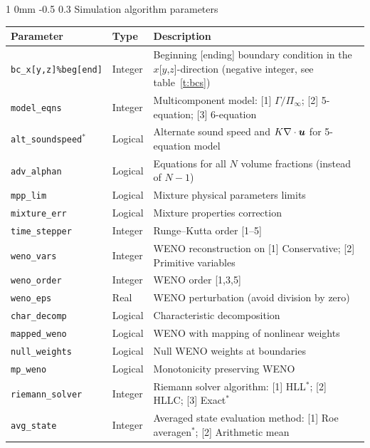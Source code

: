 \documentclass[11pt]{article}
\makeatletter
\newcommand{\ve}[1]{\bm{#1}}
\newcommand{\bu}{\ve{u}}
\renewcommand{\subsubsection}{\@startsection
{subsubsection}%
{1}%
{0mm}%
{-0.5\baselineskip}%
{0.3\baselineskip}%
{\normalfont\normalsize\bfseries\color{myBrown}}}%
\def\bm#1{\mbox{\boldmath{$#1$}}}
\newcommand\tablefont{\footnotesize}
\makeatother
\begin{document}
\subsubsection{Simulation algorithm parameters}
\begin{table}[H]
{\tablefont
\begin{tabularx}{6.5in}{ | R{1.5in} C{1in} Q{3.5in} | }
\hline
\textbf{Parameter} & \textbf{Type} & \textbf{Description} \\ \hline
    \texttt{bc\_x[y,z]\%beg[end]} &	Integer &	Beginning [ending] boundary condition in the $x$[$y$,$z$]-direction (negative integer, see table~\ref{t:bcs}) \\
    \texttt{model\_eqns}	&	Integer &		Multicomponent model: 
    									[1] $\Gamma/\Pi_\infty$; 
    									[2] 5-equation; 
    									[3] 6-equation\\%
    \texttt{alt\_soundspeed}$^{\ast}$	&	Logical &		Alternate sound speed and $K \nabla \cdot \bu$ for 5-equation model \\
    \texttt{adv\_alphan}	&	Logical &		Equations for all $N$ volume fractions (instead of $N-1$) \\
    \texttt{mpp\_lim}	&		Logical &		Mixture physical parameters limits \\
    \texttt{mixture\_err}	&	Logical &		Mixture properties correction \\
    \texttt{time\_stepper}	&	Integer &		Runge--Kutta order [1--5] \\
    \texttt{weno\_vars}	&		Integer &		WENO reconstruction on [1] Conservative; [2] Primitive variables \\
    \texttt{weno\_order}	&	Integer &		WENO order [1,3,5] \\
    \texttt{weno\_eps}	&		Real &		WENO perturbation (avoid division by zero) \\
    \texttt{char\_decomp}	&	Logical &		Characteristic decomposition \\
    \texttt{mapped\_weno}	&	Logical &		WENO with mapping of nonlinear weights \\
    \texttt{null\_weights}	&	Logical &		Null WENO weights at boundaries \\
    \texttt{mp\_weno}	&		Logical &		Monotonicity preserving WENO \\
    \texttt{riemann\_solver} &	Integer &	Riemann solver algorithm:
     								[1] HLL$^{\ast}$; [2] HLLC; [3] Exact$^{\ast}$	\\
    \texttt{avg\_state}	&		Integer &		Averaged state evaluation method: [1] Roe averagen$^{\ast}$; [2] Arithmetic mean \\

\end{tabularx}}
\end{table}
\end{document}
